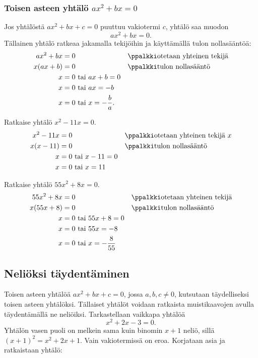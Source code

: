 \subsubsection*{Toisen asteen yhtälö $ax^2+bx=0$}
Jos yhtälöstä $ax^2+bx+c=0$ puuttuu vakiotermi $c$, yhtälö saa muodon 
$$ax^2+bx=0.$$ Tällainen yhtälö ratkeaa jakamalla tekijöihin ja käyttämällä tulon nollasääntöä:
\begin{align*}
ax^2+bx&=0 \ \ \ \ \ &&\ppalkki\text{otetaan yhteinen tekijä} \\
x(ax+b)&=0 \ \ \ \ \ &&\ppalkki\text{tulon nollasääntö} \\
x&=0 \text{ tai } ax+b=0 \\
x&=0 \text{ tai } ax=-b \\
x&=0 \text{ tai } x=-\frac{b}{a}.
\end{align*}
\begin{esimerkki}
Ratkaise yhtälö $x^2-11x=0$.
\begin{align*}
x^2-11x&=0 \ \ \ \ \  &&\ppalkki\text{otetaan yhteinen tekijä } x\\
x(x-11)&=0 \ \ \ \ \ &&\ppalkki\text{tulon nollasääntö} \\
x&=0 \text{ tai } x-11=0 \\
x&=0 \text{ tai } x=11
\end{align*}
\end{esimerkki}

\begin{esimerkki}
Ratkaise yhtälö $55x^2+8x=0$.
\begin{align*}
55x^2+8x&=0 \ \ \ \ \ &&\ppalkki\text{otetaan yhteinen tekijä} \\
x(55x+8)&=0 \ \ \ \ \ &&\ppalkki\text{tulon nollasääntö} \\
x&=0 \text{ tai } 55x+8=0 \\
x&=0 \text{ tai } 55x=-8 \\
x&=0 \text{ tai } x=-\frac{8}{55}
\end{align*}
\end{esimerkki}

\subsection{Neliöksi täydentäminen}
Toisen asteen yhtälöä $ax^2+bx+c=0$, jossa $a,b,c \neq 0$, kutsutaan täydelliseksi toisen asteen yhtälöksi. Tällaiset yhtälöt voidaan ratkaista muistikaavojen avulla täydentämällä ne neliöiksi. Tarkastellaan vaikkapa yhtälöä
\[x^2+2x-3=0.\]
Yhtälön vasen puoli on melkein sama kuin binomin $x+1$ neliö, sillä $(x+1)^2=x^2+2x+1$. Vain vakiotermissä on eroa. Korjataan asia ja ratkaistaan yhtälö:

